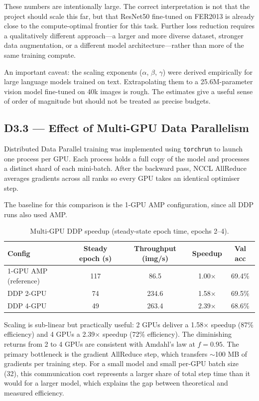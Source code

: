 These numbers are intentionally large. The correct interpretation is not
that the project should scale this far, but that ResNet50 fine-tuned on
FER2013 is already close to the compute-optimal frontier for this task.
Further loss reduction requires a qualitatively different approach—a
larger and more diverse dataset, stronger data augmentation, or a
different model architecture—rather than more of the same training
compute.

An important caveat: the scaling exponents ($\alpha$, $\beta$, $\gamma$)
were derived empirically for large language models trained on text.
Extrapolating them to a 25.6M-parameter vision model fine-tuned on 40k
images is rough. The estimates give a useful sense of order of magnitude
but should not be treated as precise budgets.

\subsection{D3.3 — Effect of Multi-GPU Data Parallelism}

Distributed Data Parallel training was implemented using
\texttt{torchrun} to launch one process per GPU. Each process holds a
full copy of the model and processes a distinct shard of each mini-batch.
After the backward pass, NCCL AllReduce averages gradients across all
ranks so every GPU takes an identical optimiser step.

The baseline for this comparison is the 1-GPU AMP configuration, since
all DDP runs also used AMP.

\begin{table}[h]
\centering
\caption{Multi-GPU DDP speedup (steady-state epoch time, epochs 2–4).}
\label{tab:ddp_speedup}
\begin{tabular}{lcccc}
\toprule
\textbf{Config} & \textbf{Steady epoch (s)}
  & \textbf{Throughput (img/s)} & \textbf{Speedup} & \textbf{Val acc} \\
\midrule
1-GPU AMP (reference) & 117 &  86.5 & 1.00$\times$ & 69.4\% \\
DDP 2-GPU             &  74 & 234.6 & 1.58$\times$ & 69.5\% \\
DDP 4-GPU             &  49 & 263.4 & 2.39$\times$ & 68.6\% \\
\bottomrule
\end{tabular}
\end{table}

Scaling is sub-linear but practically useful: 2 GPUs deliver a 1.58$\times$
speedup (87\% efficiency) and 4 GPUs a 2.39$\times$ speedup (72\% efficiency).
The diminishing returns from 2 to 4 GPUs are consistent with Amdahl's law
at $f = 0.95$. The primary bottleneck is the gradient AllReduce step,
which transfers $\sim$100 MB of gradients per training step.
For a small model and small per-GPU batch size (32), this communication
cost represents a larger share of total step time than it would for a
larger model, which explains the gap between theoretical and measured
efficiency.

